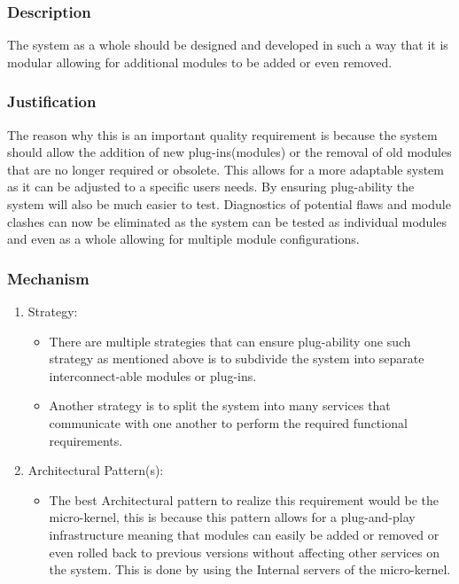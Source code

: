 \subsubsection*{Description}
The system as a whole should be designed and developed in such a way that it is modular allowing for additional modules to be added or even removed.
\subsubsection*{Justification}
The reason why this is an important quality requirement is because the system should allow the addition of new plug-ins(modules) or the removal of old modules that are no longer required or obsolete. This allows for a more adaptable system as it can be adjusted to a specific users needs. By ensuring plug-ability the system will also be much easier to test. Diagnostics of potential flaws and module clashes can now be eliminated as the system can be tested as individual modules and even as a whole allowing for multiple module configurations.
\subsubsection*{Mechanism}
	\begin{enumerate}
		\item Strategy:
		 \begin{itemize}
			\item There are multiple strategies that can ensure plug-ability one such strategy as mentioned above is to subdivide the system into separate interconnect-able modules or plug-ins.
			\item Another strategy is to split the system into many services that communicate with one another to perform the required functional requirements.
		\end{itemize}
		\item Architectural Pattern(s):
		 \begin{itemize}
			\item The best Architectural pattern to realize this requirement would be the micro-kernel, this is because this pattern allows for a plug-and-play infrastructure meaning that modules can easily be added or removed or even rolled back to previous versions without affecting other services on the system. This is done by using the Internal servers of the micro-kernel. 
		 \end{itemize} 
	\end{enumerate}